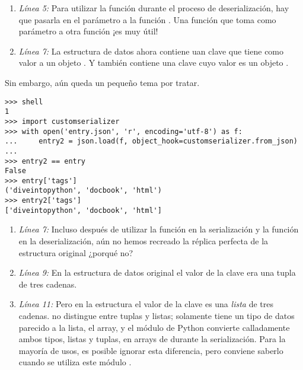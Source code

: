 \begin{enumerate}

\item \emph{Línea 5:} Para utilizar la función  durante el proceso de deserialización, hay que pasarla en el parámetro  a la función . Una función que toma como parámetro a otra función ¡es muy útil!

\item \emph{Línea 7:} La estructura de datos  ahora contiene uan clave  que tiene como valor a un objeto . Y también contiene una clave  cuyo valor es un objeto .

\end{enumerate}

Sin embargo, aún queda un pequeño tema por tratar.

\noindent\begin{minipage}{\textwidth}
\begin{lstlisting}[mathescape=True]
>>> shell
1
>>> import customserializer
>>> with open('entry.json', 'r', encoding='utf-8') as f:
...     entry2 = json.load(f, object_hook=customserializer.from_json)
... 
>>> entry2 == entry
False
>>> entry['tags']  
('diveintopython', 'docbook', 'html')
>>> entry2['tags']
['diveintopython', 'docbook', 'html']
\end{lstlisting}
\end{minipage}

\begin{enumerate}

\item \emph{Línea 7:} Incluso después de utilizar la función  en la serialización y la función  en la deserialización, aún no hemos recreado la réplica perfecta de la estructura original ¿porqué no?

\item \emph{Línea 9:} En la estructura de datos original el valor de la clave  era una tupla de tres cadenas.

\item \emph{Línea 11:} Pero en la estructura  el valor de la clave  es una \emph{lista} de tres cadenas.  no distingue entre tuplas y listas; solamente tiene un tipo de datos parecido a la lista, el array, y el módulo  de Python convierte calladamente ambos tipos, listas y tuplas, en arrays de  durante la serialización. Para la mayoría de usos, es posible ignorar esta diferencia, pero conviene saberlo cuando se utiliza este módulo .

\end{enumerate}

